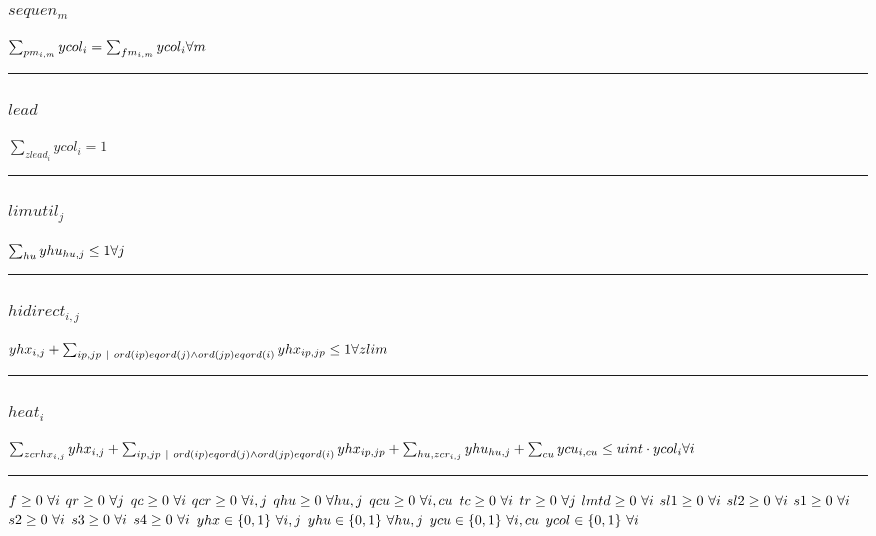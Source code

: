 \documentclass[11pt]{article}
\begin{document}
\subsubsection*{$sequen_{m}$}
$
\sum_{pm_{i,m}} ycol_{i} = \sum_{fm_{i,m}} ycol_{i}\hfill \forall m
$
\vspace{5pt}
\hrule
\subsubsection*{$lead$}
$
\sum_{zlead_{i}} ycol_{i} = 1
$
\vspace{5pt}
\hrule
\subsubsection*{$limutil_{j}$}
$
\sum_{hu} yhu_{hu,j} \leq 1\hfill \forall j
$
\vspace{5pt}
\hrule
\subsubsection*{$hidirect_{i,j}$}
$
yhx_{i,j} + \sum_{ip,jp ~ | ~ ord(ip) eq ord(j) \wedge ord(jp) eq ord(i)} yhx_{ip,jp} \leq 1\hfill \forall zlim
$
\vspace{5pt}
\hrule
\subsubsection*{$heat_{i}$}
$
\sum_{zcrhx_{i,j}} yhx_{i,j} + \sum_{ip,jp ~ | ~ ord(ip) eq ord(j) \wedge ord(jp) eq ord(i)} yhx_{ip,jp} + \sum_{hu,zcr_{i,j}} yhu_{hu,j} + \sum_{cu} ycu_{i,cu} \leq uint \cdot ycol_{i}\hfill \forall i
$
\vspace{5pt}
\hrule
\bigskip
$f\geq 0 ~ \forall i\\$
$qr\geq 0 ~ \forall j\\$
$qc\geq 0 ~ \forall i\\$
$qcr\geq 0 ~ \forall i,j\\$
$qhu\geq 0 ~ \forall hu,j\\$
$qcu\geq 0 ~ \forall i,cu\\$
$tc\geq 0 ~ \forall i\\$
$tr\geq 0 ~ \forall j\\$
$lmtd\geq 0 ~ \forall i\\$
$sl1\geq 0 ~ \forall i\\$
$sl2\geq 0 ~ \forall i\\$
$s1\geq 0 ~ \forall i\\$
$s2\geq 0 ~ \forall i\\$
$s3\geq 0 ~ \forall i\\$
$s4\geq 0 ~ \forall i\\$
$yhx\in \{0,1\} ~ \forall i,j\\$
$yhu\in \{0,1\} ~ \forall hu,j\\$
$ycu\in \{0,1\} ~ \forall i,cu\\$
$ycol\in \{0,1\} ~ \forall i\\$
\end{document}
